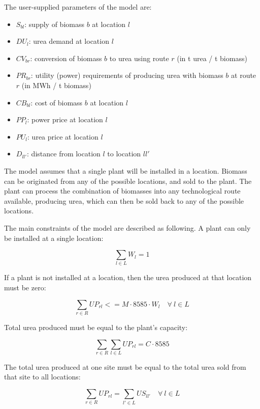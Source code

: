 \documentclass[a4paper, titlepage]{article}
\begin{document}
The user-supplied parameters of the model are:
\begin{itemize}
	\item $S_{bl}$: supply of biomass $b$ at location $l$
	\item $DU_l$: urea demand at location $l$
	\item $CV_{br}$: conversion of biomass $b$ to urea using route $r$ (in t urea / t biomass)
	\item $PR_{br}$: utility (power) requirements of producing urea with biomass $b$ at route $r$ (in MWh / t biomass)
	\item $CB_{bl}$: cost of biomass $b$ at location $l$
	\item $PP_l$: power price at location $l$
	\item $PU_l$: urea price at location $l$
	\item $D_{ll'}$: distance from location $l$ to location $ll'$
	
\end{itemize}

The model assumes that a single plant will be installed in a location. Biomass can be originated from any of the 
possible locations, and sold to the plant. The plant can process the combination of biomasses into any technological
route available, producing urea, which can then be sold back to any of the possible locations. 

The main constraints of the model are described as following. A plant can only be installed at a single location:

\begin{equation}
	\sum_{l \in L} W_l = 1
\end{equation}

If a plant is not installed at a location, then the urea produced at that location must be zero:

\begin{equation}
	\sum_{r \in R} UP_{rl} <= M \cdot 8585 \cdot W_l \quad \forall \ l \in L
\end{equation}

Total urea produced must be equal to the plant's capacity:

\begin{equation}
	\sum_{r \in R} \sum_{l \in L} UP_{rl} = C \cdot 8585
\end{equation}

The total urea produced at one site must be equal to the total urea sold from that site to all locations:

\begin{equation}
	\sum_{r \in R} UP_{rl} = \sum_{l' \in L} US_{ll'} \quad \forall \ l \in L
\end{equation}
\end{document}
